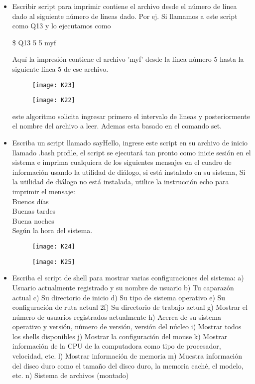 \documentclass{article}
\begin{document}
\begin{itemize}
    \item Escribir script para imprimir contiene el archivo desde el número de línea dado al siguiente número de líneas dado. Por ej. Si llamamos a este script como Q13 y lo ejecutamos como

\$ Q13 5 5 myf

Aquí la impresión contiene el archivo 'myf' desde la línea número 5 hasta la siguiente línea 5 de ese archivo.


\begin{figure}[H]
\centerline{\texttt{[image: K23]}}
\caption{}
\label{fig}
\end{figure}

\begin{figure}[H]
\centerline{\texttt{[image: K22]}}
\caption{}
\label{fig}
\end{figure}

este algoritmo solicita ingresar primero el intervalo de lineas y posteriormente el nombre del archivo a leer. Ademas esta basado en el comando set.

    \item Escriba un script llamado sayHello, ingrese este script en su archivo de inicio llamado .bash profile, el script se ejecutará tan pronto como inicie sesión en el sistema e imprima cualquiera de los siguientes mensajes en el cuadro de información usando la utilidad de diálogo, si está instalado en su sistema, Si la utilidad de diálogo no está instalada, utilice la instrucción echo para imprimir el mensaje:\\
Buenos días\\
Buenas tardes\\
Buena noches\\
Según la hora del sistema.

\begin{figure}[H]
\centerline{\texttt{[image: K24]}}
\caption{}
\label{fig}
\end{figure}

\begin{figure}[H]
\centerline{\texttt{[image: K25]}}
\caption{}
\label{fig}
\end{figure}

    \item Escriba el script de shell para mostrar varias configuraciones del sistema:
a) Usuario actualmente registrado y su nombre de usuario
b) Tu caparazón actual
c) Su directorio de inicio
d) Su tipo de sistema operativo
e) Su configuración de ruta actual
2f) Su directorio de trabajo actual
g) Mostrar el número de usuarios registrados actualmente
h) Acerca de su sistema operativo y versión, número de versión, versión del núcleo
i) Mostrar todos los shells disponibles
j) Mostrar la configuración del mouse
k) Mostrar información de la CPU de la computadora como tipo de procesador, velocidad, etc.
l) Mostrar información de memoria
m) Muestra información del disco duro como el tamaño del disco duro, la memoria caché, el modelo, etc.
n) Sistema de archivos (montado)



\end{itemize}
\end{document}
